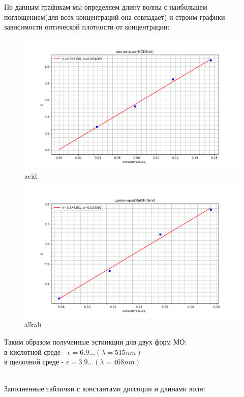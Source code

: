 \documentclass[a4paper, 12pt]{article}
\begin{document}
По данным графикам мы определяем длину волны с наибольшем поглощением(для всех концентраций она совпадает)
и строим графики зависимости оптической плотности от концентрации:
\begin{figure}[h!]
    \centering
    \includegraphics[width=120mm]{D_кисл.png}
    \caption{acid}
\end{figure}
\newpage
\begin{figure}[h!]
    \centering
    \includegraphics[width=120mm]{D_щел.png}
    \caption{alkali}
\end{figure}

Таким образом полученные эстинкции для двух форм МО:
\\
	в кислотной среде - $\epsilon = 6.9 \dots (\lambda = 515nm)$
	\\
	в щелочной среде - $\epsilon = 3.9 \dots (\lambda = 468nm)$

\\

Заполненные таблички с константами диссоции и длинами волн:
\end{document}
